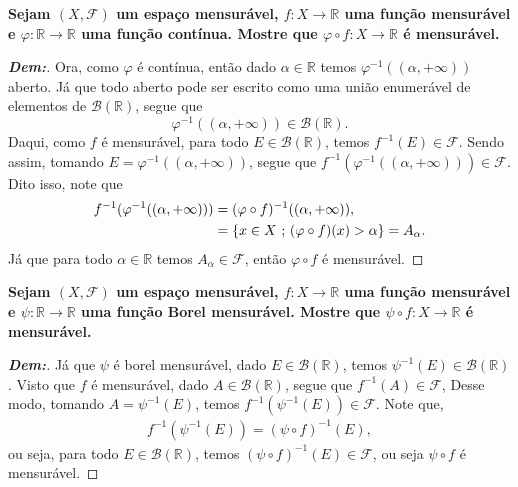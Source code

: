 \biglinend
\newpage
{}
\bigline 
\textbf{Sejam $(X, \mathcal F)$ um espaço mensurável, $f:X \rightarrow \mathbb R$ 
uma função mensurável e $\varphi: \mathbb R \rightarrow \mathbb R$ uma função contínua. 
Mostre que $\varphi \circ f: X \rightarrow \mathbb R$ é mensurável.}
\begin{proof}[\textbf{Dem:}]
  Ora, como $\varphi$ é contínua, então dado $\alpha \in \mathbb R$ temos $\varphi^{-1}((\alpha, +\infty))$ 
  aberto. Já que todo aberto pode ser escrito como uma união enumerável de elementos de $\mathcal B (\mathbb R)$,
  segue que $$\varphi^{-1}((\alpha, +\infty))\in \mathcal B(\mathbb R).$$
  Daqui, como $f$ é mensurável, para todo $E \in \mathcal B (\mathbb R)$, temos $f^{-1}(E) \in \mathcal F$. Sendo assim, 
 tomando $E = \varphi^{-1}((\alpha, +\infty))$, segue que $f^{-1}(\varphi^{-1}((\alpha, +\infty))) \in 
  \mathcal F$. Dito isso, note que 
  \begin{align*}
    f^{-1}(\varphi^{-1}((\alpha, +\infty))) &= (\varphi \circ f)^{-1}((\alpha, +\infty)),\\
    &=\{x \in X\text{ ; }  (\varphi \circ f)(x) > \alpha\} = A_{\alpha}.
  \end{align*}
  Já que para todo $\alpha \in \mathbb R$ temos $A_{\alpha} \in \mathcal F$, então $\varphi \circ f$ é mensurável.
\end{proof}

\biglinend
{}
\bigline 
\textbf{Sejam $(X, \mathcal F)$ um espaço mensurável, $f:X \rightarrow \mathbb R$ 
uma função mensurável e $\psi: \mathbb R \rightarrow \mathbb R$ uma função Borel 
mensurável. Mostre que $\psi \circ f: X \rightarrow \mathbb R$ é mensurável.}
\begin{proof}[\textbf{Dem:}]
  Já que $\psi$ é borel mensurável, dado $E \in \mathcal B(\mathbb R)$, 
  temos $\psi^{-1}(E) \in \mathcal B(\mathbb R)$. Visto que $f$ é mensurável,  dado 
  $A \in \mathcal B(\mathbb R)$, segue que $f^{-1}(A) \in \mathcal F$, Desse modo, 
  tomando $A = \psi^{-1}(E)$, temos $f^{-1}(\psi^{-1}(E)) \in \mathcal F$. Note que, 
\begin{align*}
  f^{-1}(\psi^{-1}(E)) = (\psi \circ f)^{-1}(E),
\end{align*}
  ou seja, para todo $E \in \mathcal B(\mathbb R)$, temos $(\psi \circ f)^{-1}(E) \in \mathcal F$, ou seja 
  $\psi \circ f$ é mensurável.
\end{proof}

